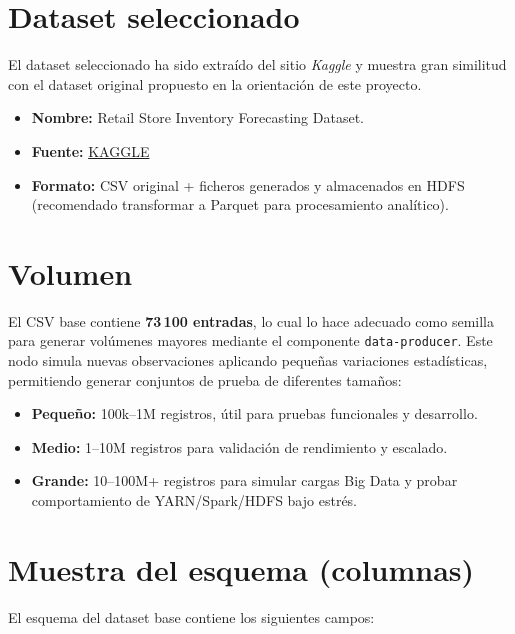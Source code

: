\documentclass[12pt,a4paper]{article}
\begin{document}
	\section{Dataset seleccionado}
	El dataset seleccionado ha sido extraído del sitio \textit{Kaggle} y muestra gran similitud con el dataset original propuesto en la orientación de este proyecto.
	
	\begin{itemize}
		\item \textbf{Nombre:} Retail Store Inventory Forecasting Dataset.
		\item \textbf{Fuente:} \href{https://www.kaggle.com/datasets/anirudhchauhan/retail-store-inventory-forecasting-dataset}{KAGGLE}
		\item \textbf{Formato:} CSV original + ficheros generados y almacenados en HDFS (recomendado transformar a Parquet para procesamiento analítico).
	\end{itemize}
	
	
	\section{Volumen}
	El CSV base contiene \textbf{73\,100 entradas}, lo cual lo hace adecuado como semilla para generar volúmenes mayores mediante el componente \texttt{data-producer}. Este nodo simula nuevas observaciones aplicando pequeñas variaciones estadísticas, permitiendo generar conjuntos de prueba de diferentes tamaños:
	
	\begin{itemize}
		\item \textbf{Pequeño:} 100k--1M registros, útil para pruebas funcionales y desarrollo.
		\item \textbf{Medio:} 1--10M registros para validación de rendimiento y escalado.
		\item \textbf{Grande:} 10--100M+ registros para simular cargas Big Data y probar comportamiento de YARN/Spark/HDFS bajo estrés.
	\end{itemize}
	
	\section{Muestra del esquema (columnas)}
	El esquema del dataset base contiene los siguientes campos:
	
\end{document}
